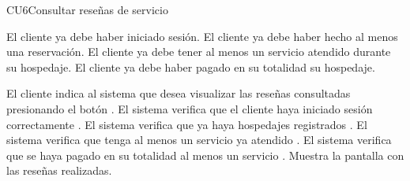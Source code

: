 \begin{UseCase}{CU6}{Consultar reseñas de servicio }
{\begin{Titemize}
		\Titem El cliente ya debe haber iniciado sesión.
		\Titem El cliente ya debe haber hecho al menos una reservación.
		\Titem El cliente ya debe tener al menos un servicio atendido durante su hospedaje.
		\Titem El cliente ya debe haber pagado en su totalidad su hospedaje.
	\end{Titemize}
	}
\end{UseCase}

\begin{UCtrayectoria}
	\UCpaso[] El cliente indica al sistema que desea visualizar las reseñas consultadas presionando el botón .
	\UCpaso[] El sistema verifica que el cliente haya iniciado sesión correctamente .
	\UCpaso[] El sistema verifica que ya haya hospedajes registrados .
	\UCpaso[] El sistema verifica que tenga al menos un servicio ya atendido .
	\UCpaso[] El sistema verifica que se haya pagado en su totalidad al menos un servicio .
	\UCpaso[] Muestra la pantalla  con las reseñas realizadas.
\end{UCtrayectoria}

